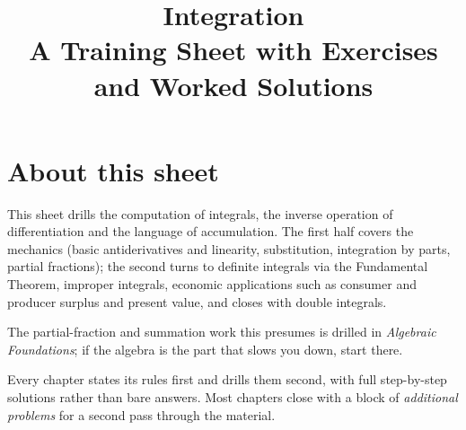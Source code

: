 \documentclass[10pt,oneside]{book}
\title{\Huge Integration\\[0.4em]
  \large A Training Sheet with Exercises and Worked Solutions}
\author{}
\date{}
\begin{document}
\frontmatter
\maketitle

\chapter*{About this sheet}

This sheet drills the computation of integrals, the inverse operation of
differentiation and the language of accumulation. The first half covers the
mechanics (basic antiderivatives and linearity, substitution, integration by
parts, partial fractions); the second turns to definite integrals via the
Fundamental Theorem, improper integrals, economic applications such as
consumer and producer surplus and present value, and closes with double
integrals.

The partial-fraction and summation work this presumes is drilled in
\emph{Algebraic Foundations}; if the algebra is the part that slows you
down, start there.

Every chapter states its rules first and drills them second, with full
step-by-step solutions rather than bare answers. Most chapters close with a
block of \emph{additional problems} for a second pass through the material.

\tableofcontents

\mainmatter








\end{document}
